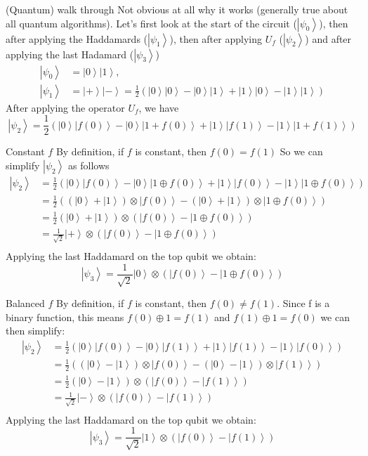 \documentclass{beamer}
\newcommand{\ket}[1]{\left| #1 \right>} %
\begin{document}
\begin{frame}{(Quantum) walk through}
	Not obvious at all why it works (generally true about all quantum algorithms). Let's first look at the start of the circuit ($\ket {\psi_0} $), then after applying the Haddamards ($\ket {\psi_1} $), then after applying $U_f$ ($\ket {\psi_2} $) and after applying the last Hadamard ($\ket {\psi_3} $)
	\newline
	\newline
	\begin{align}
		\ket {\psi_0} &= \ket{0} \ket{1},\nonumber \\
		\ket {\psi_1} &= \ket{+}\ket{-} = \frac{1}{2}(\ket{0}\ket{0}-\ket{0}\ket{1}+\ket{1}\ket{0}-\ket{1}\ket{1}) \nonumber
	\end{align}
	After applying the operator $U_f$, we have 
	$$
	\ket {\psi_2} = \frac{1}{2}(\ket{0}\ket{f(0)}-\ket{0}\ket{1+f(0)}+\ket{1}\ket{f(1)}-\ket{1}\ket{1+f(1)}) 
	$$
\end{frame}

\begin{frame}{Constant $f$}
	\justifying
	By definition, if $f$ is constant, then $f(0)=f(1)$ So we can simplify $\ket{\psi_2}$ as follows
	\begin{align} 
		\ket{\psi_2} &= \frac{1}{2} (\ket{0}\ket {f(0)}- \ket{0}\ket{1 \oplus f(0)} + \ket{1}\ket{f(0)} - \ket{1}\ket{1 \oplus f(0)}           ) \nonumber \\
		&= \nonumber \frac{1}{2} ((\ket {0}+ \ket{1}) \otimes \ket{f(0)} -  (\ket {0}+ \ket{1}) \otimes \ket{1 \oplus f(0)})\\
		&= \nonumber \frac{1}{2} (\ket {0}+ \ket{1}) \otimes (\ket{f(0)}-\ket{1 \oplus f(0)}) \\
		&= \nonumber \frac{1}{\sqrt{2}}\ket{+} \otimes (\ket{f(0)}-\ket{1 \oplus f(0)} )\\
	\end{align}
	Applying the last Haddamard on the top qubit we obtain:
	$$
	\ket{\psi_3}=\frac{1}{\sqrt{2}}\ket{0} \otimes (\ket{f(0)}-\ket{1 \oplus f(0)})
	$$
\end{frame}

\begin{frame}{Balanced $f$}
	\justifying
	By definition, if $f$ is constant, then $f(0) \neq f(1)$. Since f is a binary function, this means $f(0) \oplus 1 = f(1)$ and $f(1) \oplus 1 = f(0)$ we can then simplify:
	\begin{align} 
		\ket{\psi_2} &= \frac{1}{2} (\ket{0}\ket {f(0)}- \ket{0}\ket{f(1)} + \ket{1}\ket{f(1)} - \ket{1}\ket{f(0)}           ) \nonumber \\
		&= \nonumber \frac{1}{2} ((\ket {0}- \ket{1}) \otimes \ket{f(0)} -  (\ket {0}- \ket{1}) \otimes \ket{ f(1)})\\
		&= \nonumber \frac{1}{2} (\ket {0}- \ket{1}) \otimes (\ket{f(0)}-\ket{ f(1)}) \\
		&= \nonumber \frac{1}{\sqrt{2}}\ket{-} \otimes (\ket{f(0)}-\ket{ f(1)} )\\
	\end{align}
	Applying the last Haddamard on the top qubit we obtain:
	$$
	\ket{\psi_3}=\frac{1}{\sqrt{2}}\ket{1} \otimes (\ket{f(0)}-\ket{ f(1)})
	$$
\end{frame}
\end{document}
